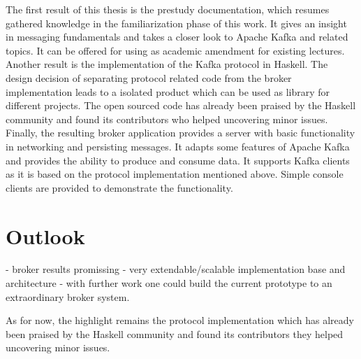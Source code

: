 The first result of this thesis is the prestudy documentation, which resumes
gathered knowledge in the familiarization phase of this work. It gives an
insight in messaging fundamentals and  takes a closer look to Apache Kafka and
related topics. It can be offered for using as academic amendment for existing
lectures. Another result is the implementation of the Kafka protocol in Haskell.
The design decision of separating protocol related code from the broker
implementation leads to a isolated product which can be used as library for
different projects. The open sourced code has already been praised by the
Haskell community and found its contributors who helped uncovering minor issues.
Finally, the resulting broker application provides a server with basic
functionality in networking and persisting messages. It adapts some features of
Apache Kafka and provides the ability to produce and consume data. It supports
Kafka clients as it is based on the protocol implementation mentioned above.
Simple console clients are provided to demonstrate the functionality.

\section{Outlook}

- broker results promissing
- very extendable/scalable implementation base and architecture
- with further work one could build the current prototype to an extraordinary
broker system.

As for now, the highlight remains the protocol implementation which has already
been praised by the Haskell community and found its contributors they helped
uncovering minor issues.
